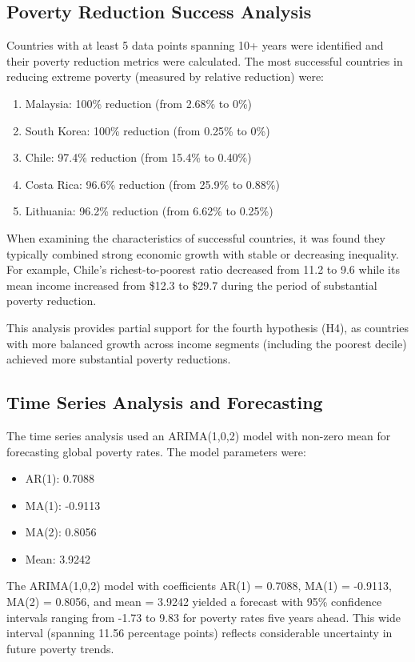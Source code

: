 \documentclass[12pt,a4paper]{article}
\begin{document}
\subsection{Poverty Reduction Success Analysis}
Countries with at least 5 data points spanning 10+ years were identified and their poverty reduction metrics were calculated. The most successful countries in reducing extreme poverty (measured by relative reduction) were:
\begin{enumerate}
    \item Malaysia: 100\% reduction (from 2.68\% to 0\%)
    \item South Korea: 100\% reduction (from 0.25\% to 0\%)
    \item Chile: 97.4\% reduction (from 15.4\% to 0.40\%)
    \item Costa Rica: 96.6\% reduction (from 25.9\% to 0.88\%)
    \item Lithuania: 96.2\% reduction (from 6.62\% to 0.25\%)
\end{enumerate}

When examining the characteristics of successful countries, it was found they typically combined strong economic growth with stable or decreasing inequality. For example, Chile's richest-to-poorest ratio decreased from 11.2 to 9.6 while its mean income increased from \$12.3 to \$29.7 during the period of substantial poverty reduction.

This analysis provides partial support for the fourth hypothesis (H4), as countries with more balanced growth across income segments (including the poorest decile) achieved more substantial poverty reductions.

\subsection{Time Series Analysis and Forecasting}
The time series analysis used an ARIMA(1,0,2) model with non-zero mean for forecasting global poverty rates. The model parameters were:
\begin{itemize}
    \item AR(1): 0.7088
    \item MA(1): -0.9113
    \item MA(2): 0.8056
    \item Mean: 3.9242
\end{itemize}

The ARIMA(1,0,2) model with coefficients AR(1) = 0.7088, MA(1) = -0.9113, MA(2) = 0.8056, and mean = 3.9242 yielded a forecast with 95\% confidence intervals ranging from -1.73 to 9.83 for poverty rates five years ahead. This wide interval (spanning 11.56 percentage points) reflects considerable uncertainty in future poverty trends.
\end{document}
